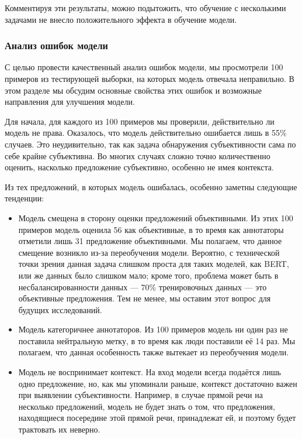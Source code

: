 \documentclass[conference]{IEEEtran}
\begin{document}
Комментируя эти результаты, можно подытожить, что обучение с несколькими задачами не внесло положительного эффекта в обучение модели.

\subsubsection{Анализ ошибок модели}
С целью провести качественный анализ ошибок модели, мы просмотрели 100 примеров из тестирующей выборки, на которых модель отвечала неправильно. В этом разделе мы обсудим основные свойства этих ошибок и возможные направления для улучшения модели.

Для начала, для каждого из 100 примеров мы проверили, действительно ли модель не права. Оказалось, что модель действительно ошибается лишь в 55\% случаев. Это неудивительно, так как задача обнаружения субъективности сама по себе крайне субъективна. Во многих случаях сложно точно количественно оценить, насколько предложение субъективно, особенно не имея контекста.

Из тех предложений, в которых модель ошибалась, особенно заметны следующие тенденции:
\begin{itemize}
    \item Модель смещена в сторону оценки предложений объективными. Из этих 100 примеров модель оценила 56 как объективные, в то время как аннотаторы отметили лишь 31 предложение объективными. Мы полагаем, что данное смещение возникло из-за переобучения модели.  Вероятно, с технической точки зрения данная задача слишком проста для таких моделей, как BERT, или же данных было слишком мало; кроме того, проблема может быть в несбалансированности данных --- 70\% тренировочных данных --- это объективные предложения. Тем не менее, мы оставим этот вопрос для будущих исследований.
    \item Модель категоричнее аннотаторов. Из 100 примеров модель ни один раз не поставила нейтральную метку, в то время как люди поставили её 14 раз. Мы полагаем, что данная особенность также вытекает из переобучения модели.
    \item Модель не воспринимает контекст. На вход модели всегда подаётся лишь одно предложение, но, как мы упоминали раньше, контекст достаточно важен при выявлении субъективности. Например, в случае прямой речи на несколько предложений, модель не будет знать о том, что предложения, находящиеся посередине этой прямой речи, принадлежат ей, и поэтому будет трактовать их неверно.
\end{itemize}
\end{document}
